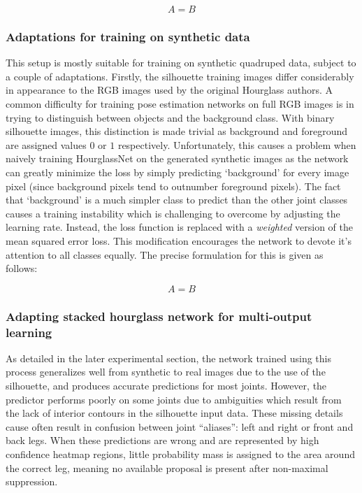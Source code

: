 \begin{equation}\label{eq:non-max-suppression}
    A = B    
\end{equation}

\subsubsection{Adaptations for training on synthetic data}

This setup is mostly suitable for training on synthetic quadruped data, subject to a couple of adaptations. Firstly, the silhouette training images differ considerably in appearance to the RGB images used by the original Hourglass authors. A common difficulty for training pose estimation networks on full RGB images is in trying to distinguish between objects and the background class. With binary silhouette images, this distinction is made trivial as background and foreground are assigned values $0$ or $1$ respectively. Unfortunately, this causes a problem when naively training HourglassNet on the generated synthetic images as the network can greatly minimize the loss by simply predicting `background' for every image pixel (since background pixels tend to outnumber foreground pixels). The fact that `background' is a much simpler class to predict than the other joint classes causes a training instability which is challenging to overcome by adjusting the learning rate. Instead, the loss function is replaced with a \emph{weighted} version of the mean squared error loss. This modification encourages the network to devote it's attention to all classes equally. The precise formulation for this is given as follows:

\begin{equation}\label{eq:weighted-mse}
    A = B
\end{equation}


\subsubsection{Adapting stacked hourglass network for multi-output learning}

As detailed in the later experimental section, the network trained using this process generalizes well from synthetic to real images due to the use of the silhouette, and produces accurate predictions for most joints. However, the predictor performs poorly on some joints due to ambiguities which result from the lack of interior contours in the silhouette input data. These missing details cause often result in confusion between joint ``aliases'': left and right or front and back legs.  When these predictions are wrong and are represented by high confidence heatmap regions, little probability mass is assigned to the area around the correct leg, meaning no available proposal is present after non-maximal suppression.

